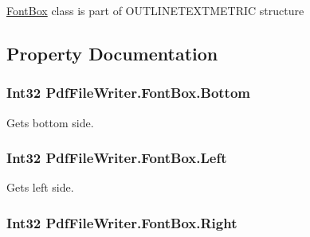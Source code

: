 \hyperlink{class_pdf_file_writer_1_1_font_box}{Font\+Box} class is part of O\+U\+T\+L\+I\+N\+E\+T\+E\+X\+T\+M\+E\+T\+R\+IC structure 

\subsection{Property Documentation}
\subsubsection[{\texorpdfstring{Bottom}{Bottom}}]{\setlength{\rightskip}{0pt plus 5cm}Int32 Pdf\+File\+Writer.\+Font\+Box.\+Bottom\hspace{0.3cm}{\ttfamily [get]}}\hypertarget{class_pdf_file_writer_1_1_font_box_af1a7f9cc610e28907494004b9170af56}{}\label{class_pdf_file_writer_1_1_font_box_af1a7f9cc610e28907494004b9170af56}


Gets bottom side. 

\subsubsection[{\texorpdfstring{Left}{Left}}]{\setlength{\rightskip}{0pt plus 5cm}Int32 Pdf\+File\+Writer.\+Font\+Box.\+Left\hspace{0.3cm}{\ttfamily [get]}}\hypertarget{class_pdf_file_writer_1_1_font_box_a0b0c7cd75afb3f3cedb4298ca8717320}{}\label{class_pdf_file_writer_1_1_font_box_a0b0c7cd75afb3f3cedb4298ca8717320}


Gets left side. 

\subsubsection[{\texorpdfstring{Right}{Right}}]{\setlength{\rightskip}{0pt plus 5cm}Int32 Pdf\+File\+Writer.\+Font\+Box.\+Right\hspace{0.3cm}{\ttfamily [get]}}\hypertarget{class_pdf_file_writer_1_1_font_box_a900427254bf3e38bb6f11262c5059cc6}{}\label{class_pdf_file_writer_1_1_font_box_a900427254bf3e38bb6f11262c5059cc6}


